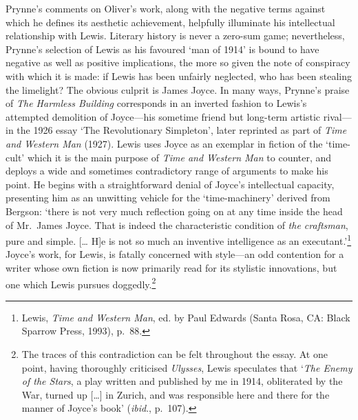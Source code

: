 \documentclass[]{article}
\begin{document}
Prynne's comments on Oliver's work, along with the negative terms
against which he defines its aesthetic achievement, helpfully illuminate
his intellectual relationship with Lewis. Literary history is never a
zero-sum game; nevertheless, Prynne's selection of Lewis as his favoured
`man of 1914' is bound to have negative as well as positive
implications, the more so given the note of conspiracy with which it is
made: if Lewis has been unfairly neglected, who has been stealing the
limelight? The obvious culprit is James Joyce. In many ways, Prynne's
praise of \emph{The Harmless Building} corresponds in an inverted
fashion to Lewis's attempted demolition of Joyce---his sometime friend
but long-term artistic rival---in the 1926 essay `The Revolutionary
Simpleton', later reprinted as part of \emph{Time and Western Man}
(1927). Lewis uses Joyce as an exemplar in fiction of the `time-cult'
which it is the main purpose of \emph{Time and Western Man} to counter,
and deploys a wide and sometimes contradictory range of arguments to
make his point. He begins with a straightforward denial of Joyce's
intellectual capacity, presenting him as an unwitting vehicle for the
`time-machinery' derived from Bergson: `there is not very much
reflection going on at any time inside the head of Mr.~James Joyce. That
is indeed the characteristic condition of \emph{the craftsman}, pure and
simple. {[}\ldots{} H{]}e is not so much an inventive intelligence as an
executant.'\footnote{Lewis, \emph{Time and Western Man}, ed. by Paul
  Edwards (Santa Rosa, CA: Black Sparrow Press, 1993), p.~88.} Joyce's
work, for Lewis, is fatally concerned with style---an odd contention for
a writer whose own fiction is now primarily read for its stylistic
innovations, but one which Lewis pursues doggedly.\footnote{The traces
  of this contradiction can be felt throughout the essay. At one point,
  having thoroughly criticised \emph{Ulysses}, Lewis speculates that
  `\emph{The Enemy of the Stars}, a play written and published by me in
  1914, obliterated by the War, turned up {[}\ldots{}{]} in Zurich, and
  was responsible here and there for the manner of Joyce's book'
  (\emph{ibid}., p.~107).}
\end{document}
